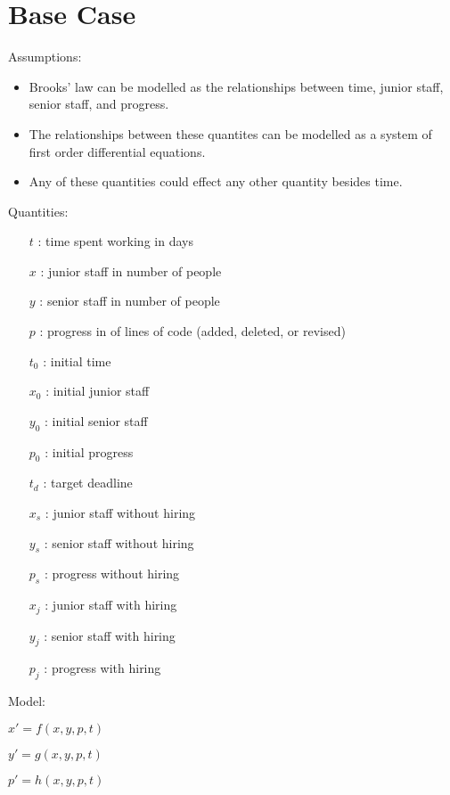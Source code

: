 \documentclass{article}
\newenvironment{atomize}
    {\begin{list} {} {
            \setlength\itemindent{0pt}
            \setlength\leftmargin{10pt}
            \setlength\labelwidth{0pt}
    }}
    {\end{list}}
\begin{document}
\section*{Base Case}
  \begin{atomize}
    \item Assumptions:
      \begin{itemize}
				\item Brooks' law can be modelled as the relationships between
				time, junior staff, senior staff, and progress.
				\item The relationships between these quantites can be modelled
				as a system of first order differential equations.
				\item Any of these quantities could effect any other quantity besides
				time.  
        \end{itemize}

    \item Quantities:
      \begin{itemize}
        \item [$t$]: time spent working in days
        \item [$x$]: junior staff in number of people
        \item [$y$]: senior staff in number of people
        \item [$p$]: progress in of lines of code (added, deleted, or revised)
        \item [$t_{0}$]: initial time
        \item [$x_{0}$]: initial junior staff
        \item [$y_{0}$]: initial senior staff
        \item [$p_{0}$]: initial progress
        \item [$t_{d}$]: target deadline
				\item [$x_{s}$]: junior staff without hiring
				\item [$y_{s}$]: senior staff without hiring
        \item [$p_{s}$]: progress without hiring
        \item [$x_{j}$]: junior staff with hiring
				\item [$y_{j}$]: senior staff with hiring
        \item [$p_{j}$]: progress with hiring
      \end{itemize}

    \item Model:
      \begin{atomize}
        \item $x\prime = f\left(x, y, p, t\right)$
        \item $y\prime = g\left(x, y, p, t\right)$
        \item $p\prime = h\left(x, y, p, t\right)$
      \end{atomize}
  \end{atomize}
\end{document}
